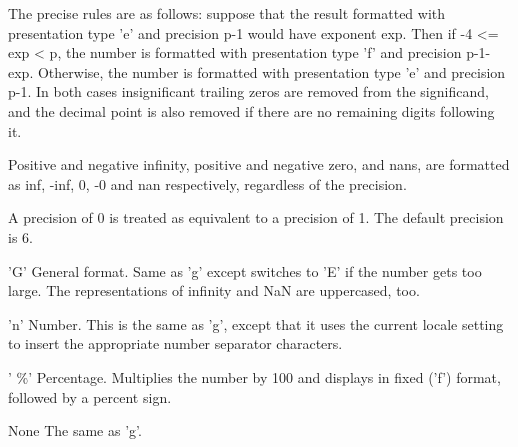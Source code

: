 The precise rules are as follows: suppose that the result formatted with presentation type 'e' and precision p-1 would have exponent exp. Then if -4 <= exp < p, the number is formatted with presentation type 'f' and precision p-1-exp. Otherwise, the number is formatted with presentation type 'e' and precision p-1. In both cases insignificant trailing zeros are removed from the significand, and the decimal point is also removed if there are no remaining digits following it. \par
Positive and negative infinity, positive and negative zero, and nans, are formatted as inf, -inf, 0, -0 and nan respectively, regardless of the precision. \par
A precision of 0 is treated as equivalent to a precision of 1. The default precision is 6. \par
'G' \hspace*{0.5in} General format. Same as 'g' except switches to 'E' if the number gets too large. The representations of infinity and NaN are uppercased, too. \par
'n' \hspace*{0.5in} Number. This is the same as 'g', except that it uses the current locale setting to insert the appropriate number separator characters. \par
' $  \%  $' \hspace*{0.5in} Percentage. Multiplies the number by 100 and displays in fixed ('f') format, followed by a percent sign. \par
None \hspace*{0.5in} The same as 'g'. \par
\vspace{12pt}
\vspace{12pt}
